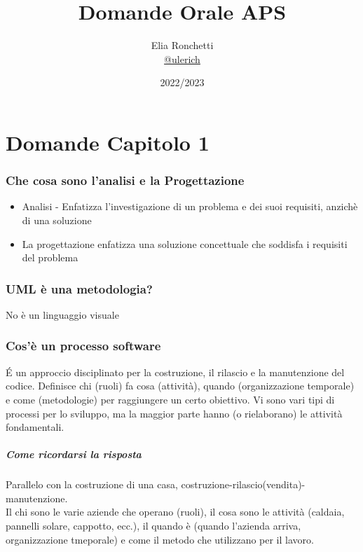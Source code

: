 \documentclass[12pt, a4paper, openany]{book}
\begin{document}
\title{Domande Orale APS}

\author{
    Elia Ronchetti\\
	\small{\href{https://t.me/ulerich}{@ulerich}}
}

\date{2022/2023}

\maketitle

\tableofcontents

\chapter{Domande Capitolo 1}
\subsection*{Che cosa sono l'analisi e la Progettazione}
\begin{itemize}
    \item Analisi - Enfatizza l'investigazione di un problema e dei suoi requisiti,
    anzichè di una soluzione
    \item La progettazione enfatizza una soluzione concettuale che soddisfa i
    requisiti del problema
\end{itemize}

\subsection*{UML è una metodologia?}
No è un linguaggio visuale

\subsection*{Cos'è un processo software}
\'E un approccio disciplinato per la costruzione, il rilascio e la manutenzione del codice. Definisce chi (ruoli) fa cosa
(attività), quando (organizzazione temporale) e come (metodologie) per raggiungere un certo obiettivo. Vi sono
vari tipi di processi per lo sviluppo, ma la maggior parte hanno (o rielaborano) le attività fondamentali.
\paragraph*{Come ricordarsi la risposta} Parallelo con la costruzione di una casa, costruzione-rilascio(vendita)-manutenzione.\\
Il chi sono le varie aziende che operano (ruoli), il cosa sono le attività (caldaia, pannelli solare, cappotto, ecc.), il quando
è (quando l'azienda arriva, organizzazione tmeporale) e come il metodo che utilizzano per il lavoro.
\end{document}
